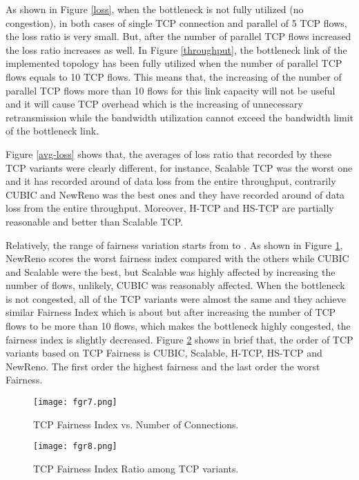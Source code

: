 \documentclass[a4paper, conference]{IEEEtran}
\begin{document}
As shown in Figure \ref{loss}, when the bottleneck is not fully utilized (no congestion), in both cases of single TCP connection and parallel of 5 TCP flows, the loss ratio is very small. But, after the number of parallel TCP flows increased the loss ratio increases as well. In Figure \ref{throughput}, the bottleneck link of the implemented topology has been fully utilized when the number of parallel TCP flows equals to 10 TCP flows. This means that, the increasing of the number of parallel TCP flows more than 10 flows for this link capacity will not be useful and it will cause TCP overhead which is the increasing of unnecessary retransmission while the bandwidth utilization cannot exceed the bandwidth limit of the bottleneck link.

Figure \ref{avg-loss} shows that, the averages of loss ratio that recorded by these TCP variants were clearly different, for instance, Scalable TCP was the worst one and it has recorded around  of data loss from the entire throughput, contrarily CUBIC and NewReno was the best ones and they have recorded around  of data loss from the entire throughput. Moreover, H-TCP and HS-TCP are partially reasonable and better than Scalable TCP. 

Relatively, the range of fairness variation starts from  to . As shown in Figure \ref{fairness-index}, NewReno scores the worst fairness index compared with the others while CUBIC and Scalable were the best, but Scalable was highly affected by increasing the number of flows, unlikely, CUBIC was reasonably affected. When the bottleneck is not congested, all of the TCP variants were almost the same and they achieve similar Fairness Index which is about  but after increasing the number of TCP flows to be more than 10 flows, which makes the bottleneck highly congested, the fairness index is slightly decreased. Figure \ref{fairness-ratio} shows in brief that, the order of TCP variants based on TCP Fairness is CUBIC, Scalable, H-TCP, HS-TCP and NewReno. The first order the highest fairness and the last order the worst Fairness.

\begin{figure}[h]
\centerline{\texttt{[image: fgr7.png]}}
\caption{TCP Fairness Index vs. Number of Connections.}
\label{fairness-index}
\end{figure}

\begin{figure}[h]
\centerline{\texttt{[image: fgr8.png]}}
\caption{TCP Fairness Index Ratio among TCP variants.}
\label{fairness-ratio}
\end{figure}
\end{document}
